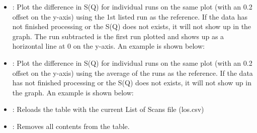 \begin{itemize}
\item {}: Plot the difference in S(Q) for individual runs on the same plot (with an 0.2 offset on the y-axis) using the 1st listed run as the reference. If the data has not finished processing or the S(Q) does not exists, it will not show up in the graph. The run subtracted is the first run plotted and shows up as a horizontal line at 0 on the y-axis. An example is shown below:

\noindent{}

\item {}: Plot the difference in S(Q) for individual runs on the same plot (with an 0.2 offset on the y-axis) using the average of the runs as the reference. If the data has not finished processing or the S(Q) does not exists, it will not show up in the graph.  An example is shown below:


\noindent{}

\item {}: Reloads the table with the current List of Scans file (los.csv)

\item {}: Removes all contents from the table.

\end{itemize}

